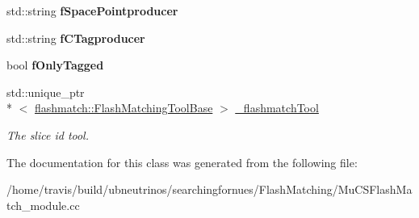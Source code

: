 \begin{DoxyCompactItemize}
\item 
\hypertarget{classMuCSFlashMatch_a72e882170ac31de572a22fec62b2c92f}{std\-::string {\bfseries f\-Space\-Pointproducer}}\label{classMuCSFlashMatch_a72e882170ac31de572a22fec62b2c92f}

\item 
\hypertarget{classMuCSFlashMatch_ad581a60155500fe7ddd4c66242575d52}{std\-::string {\bfseries f\-C\-Tagproducer}}\label{classMuCSFlashMatch_ad581a60155500fe7ddd4c66242575d52}

\item 
\hypertarget{classMuCSFlashMatch_ac8212264ca73cfbbb95e8357dce03393}{bool {\bfseries f\-Only\-Tagged}}\label{classMuCSFlashMatch_ac8212264ca73cfbbb95e8357dce03393}

\item 
\hypertarget{classMuCSFlashMatch_ac7d7c6f36ada7a806d24854f30e68c54}{std\-::unique\-\_\-ptr\\*
$<$ \hyperlink{classflashmatch_1_1FlashMatchingToolBase}{flashmatch\-::\-Flash\-Matching\-Tool\-Base} $>$ \hyperlink{classMuCSFlashMatch_ac7d7c6f36ada7a806d24854f30e68c54}{\-\_\-flashmatch\-Tool}}\label{classMuCSFlashMatch_ac7d7c6f36ada7a806d24854f30e68c54}

\begin{DoxyCompactList}\small\item\em The slice id tool. \end{DoxyCompactList}\end{DoxyCompactItemize}


The documentation for this class was generated from the following file\-:\begin{DoxyCompactItemize}
\item 
/home/travis/build/ubneutrinos/searchingfornues/\-Flash\-Matching/Mu\-C\-S\-Flash\-Match\-\_\-module.\-cc\end{DoxyCompactItemize}
